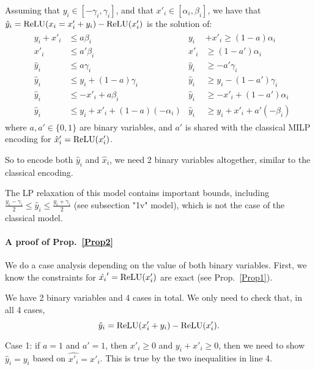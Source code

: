 \begin{proposition}
    \label{Prop2}
Assuming that $y_i \in [-\gamma_i, \gamma_i]$,
and that $x'_i \in [\alpha_i,\beta_i]$,
we have that $\hat{y}_i = \mathrm{ReLU}(x_i=x'_i+y_i)-\mathrm{ReLU}(x'_i)$ is the solution of:
	\begin{align*}
		& \begin{aligned}
			y_i + x'_i &\leq a\beta_i        &
			y_i &+ x'_i \geq (1-a)\alpha_i \\
			x'_i       &\leq a'\beta_i       & 
			x'_i       &\geq (1-a')\alpha_i \\
			\hat{y}_i  &\leq a\gamma_i       &
			\hat{y}_i  &\geq -a'\gamma_i \\
			\hat{y}_i  &\leq y_i + (1-a)\gamma_i  &
			\hat{y}_i  &\geq y_i - (1-a')\gamma_i \\
			\hat{y}_i  &\leq -x'_i + a\beta_i &
			\hat{y}_i  &\geq -x'_i + (1-a')\alpha_i \\
			\hat{y}_i  &\leq y_i + x'_i + (1-a)(-\alpha_i) &
			\hat{y}_i  &\geq y_i + x'_i + a'(-\beta_i)
		\end{aligned}
	\end{align*} 
    where $a,a' \in \{0,1\}$ are binary variables, 
    and $a'$ is shared with the classical MILP
    encoding for $\hat{x}'_i=\mathrm{ReLU}(x'_i)$.
\end{proposition}

So to encode both $\hat{y}_i$ and $\hat{x}_i$, we need 2 binary variables altogether, similar to the classical encoding.

The LP relaxation of this model contains important bounds, including 
    $\frac{y_i-\gamma_i}{2} \leq \hat{y}_i \leq \frac{y_i+\gamma_i}{2}$
    (see subsection "1v" model), which is not the case of the classical model.
	

	\iffalse
\paragraph{A proof of Prop.~\ref{Prop2}}

We do a case analysis depending on the value of both binary variables. 
First, we know the constraints for $\hat{x_i}'=\mathrm{ReLU}(x_i')$ are exact (see 
Prop.~\ref{Prop1}). 

We have 2 binary variables and 4 cases in total. We only need to check that, in all 4 cases, $$\hat{y}_i = \mathrm{ReLU}(x'_i+y_i)-\mathrm{ReLU}(x'_i).$$

Case 1: if $a = 1$ and $a' = 1$, then $x'_i \geq 0 $ and $y_i+x'_i\geq 0$, then we need to show $\hat{y}_i = y_i$ based on  $\hat{x'_i} = x'_i$. This is true by the two inequalities in line 4.


